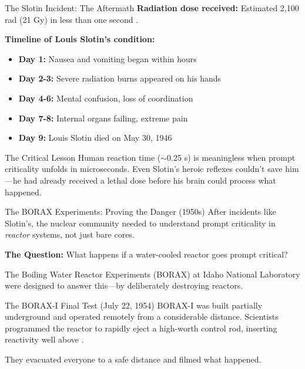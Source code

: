 \documentclass[aspectratio=169]{beamer}
\begin{document}
\begin{frame}[allowframebreaks]{The Slotin Incident: The Aftermath}
    \textbf{Radiation dose received:} Estimated 2,100 rad (21 Gy) in less than one second \cite{stratton1989review}.

    \vspace{1em}
    \textbf{Timeline of Louis Slotin's condition:}
    \begin{itemize}
        \item \textbf{Day 1:} Nausea and vomiting began within hours
        \item \textbf{Day 2-3:} Severe radiation burns appeared on his hands
        \item \textbf{Day 4-6:} Mental confusion, loss of coordination
        \item \textbf{Day 7-8:} Internal organs failing, extreme pain
        \item \textbf{Day 9:} Louis Slotin died on May 30, 1946
    \end{itemize}

    \vspace{1em}
    \begin{alertblock}{The Critical Lesson}
        Human reaction time ($\sim$0.25 s) is meaningless when prompt criticality unfolds in microseconds. Even Slotin's heroic reflexes couldn't save him—he had already received a lethal dose before his brain could process what happened.
    \end{alertblock}
\end{frame}

\begin{frame}[allowframebreaks]{The BORAX Experiments: Proving the Danger (1950s)}
    After incidents like Slotin's, the nuclear community needed to understand prompt criticality in \textit{reactor} systems, not just bare cores.

    \vspace{1em}
    \textbf{The Question:} What happens if a water-cooled reactor goes prompt critical?

    \vspace{1em}
    The Boiling Water Reactor Experiments (BORAX) at Idaho National Laboratory were designed to answer this—by deliberately destroying reactors.

    \vspace{1em}
    \begin{block}{The BORAX-I Final Test (July 22, 1954)}
        BORAX-I was built partially underground and operated remotely from a considerable distance. Scientists programmed the reactor to rapidly eject a high-worth control rod, inserting reactivity well above  \cite{putman2012criticality}.
        
        They evacuated everyone to a safe distance and filmed what happened.
    \end{block}
\end{frame}
\end{document}
